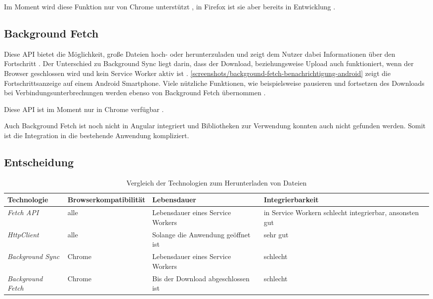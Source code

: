 Im Moment wird diese Funktion nur von Chrome unterstützt \autocite{caniuse-background-sync}, in Firefox ist sie aber bereits in Entwicklung \autocite{status-mozilla-background-sync}.

\subsection{Background Fetch}
Diese \ac{API} bietet die Möglichkeit, große Dateien hoch- oder herunterzuladen und zeigt dem Nutzer dabei Informationen über den Fortschritt \autocite{google-background-fetch}. Der Unterschied zu Background Sync liegt darin, dass der Download, beziehungsweise Upload auch funktioniert, wenn der Browser geschlossen wird und kein Service Worker aktiv ist \autocite{google-background-fetch}. \autoref{screenshots/background-fetch-benachrichtigung-android} zeigt die Fortschrittsanzeige auf einem Android Smartphone. Viele nützliche Funktionen, wie beispielsweise pausieren und fortsetzen des Downloads bei Verbindungsunterbrechungen werden ebenso von Background Fetch übernommen \autocite{google-background-fetch}. 


Diese \ac{API} ist im Moment nur in Chrome verfügbar \autocite{google-background-fetch}.

Auch Background Fetch ist noch nicht in Angular integriert und Bibliotheken zur Verwendung konnten auch nicht gefunden werden. Somit ist die Integration in die bestehende Anwendung kompliziert.

\subsection{Entscheidung}

\begin{table}[h]
  \renewcommand{\arraystretch}{1.2}
  \centering
  \sffamily
  \begin{footnotesize}
    \begin{tabularx}{0.9\textwidth}{l L L L}
      \toprule
      \textbf{Technologie} & \textbf{Browserkompatibilität} & \textbf{Lebensdauer} & \textbf{Integrierbarkeit} \\
      \midrule
      \emph{Fetch \ac{API}} & alle & Lebensdauer eines Service Workers & in Service Workern schlecht integrierbar, ansonsten gut \\
      \emph{HttpClient} & alle & Solange die Anwendung geöffnet ist & sehr gut \\
      \emph{Background Sync} & Chrome & Lebensdauer eines Service Workers & schlecht \\
      \emph{Background Fetch} & Chrome & Bis der Download abgeschlossen ist & schlecht \\
      \bottomrule
    \end{tabularx}
  \end{footnotesize}
  \rmfamily
  \caption{Vergleich der Technologien zum Herunterladen von Dateien}
  \label{Kap4:DownloadTechnologien}
\end{table}

